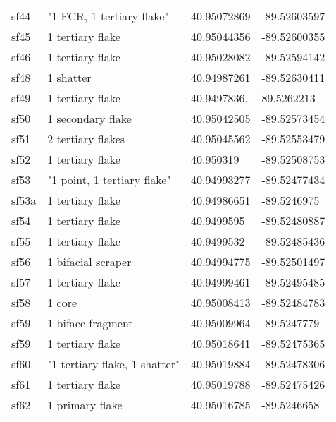 \begin{longtable}{p{1cm}p{6cm}ll}
	sf44 & "1 FCR, 1 tertiary flake" & 40.95072869 & -89.52603597\\
	sf45 & 1 tertiary flake & 40.95044356 & -89.52600355\\
	sf46 & 1 tertiary flake & 40.95028082 & -89.52594142\\

	sf48 & 1 shatter & 40.94987261 & -89.52630411\\
	sf49 & 1 tertiary flake & 40.9497836, & 89.5262213\\
	sf50 & 1 secondary flake & 40.95042505 & -89.52573454\\
	sf51 & 2 tertiary flakes & 40.95045562 & -89.52553479\\
	sf52 & 1 tertiary flake & 40.950319 & -89.52508753\\
	sf53 & "1 point, 1 tertiary flake" & 40.94993277 & -89.52477434\\
	sf53a & 1 tertiary flake & 40.94986651 & -89.5246975\\
	sf54 & 1 tertiary flake & 40.9499595 & -89.52480887\\
	sf55 & 1 tertiary flake & 40.9499532 & -89.52485436\\
	sf56 & 1 bifacial scraper & 40.94994775 & -89.52501497\\
	sf57 & 1 tertiary flake & 40.94999461 & -89.52495485\\
	sf58 & 1 core & 40.95008413 & -89.52484783\\
	sf59 & 1 biface fragment & 40.95009964 & -89.5247779\\
	sf59 & 1 tertiary flake & 40.95018641 & -89.52475365\\
	sf60 & "1 tertiary flake, 1 shatter" & 40.95019884 & -89.52478306\\
	sf61 & 1 tertiary flake & 40.95019788 & -89.52475426\\
	sf62 & 1 primary flake & 40.95016785 & -89.5246658\\


\end{longtable}
